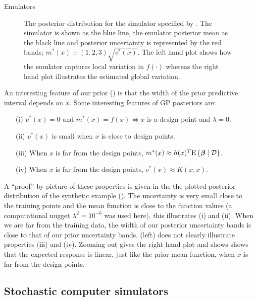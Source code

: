 \begin{chapter}{Emulators \label{Ch:Emulators}}
\begin{figure}[h]
  \caption{The posterior distribution for the simulator specified by . The simulator is shown as the blue line, the emulator posterior mean as the black line and posterior uncertainty is represented by the red bands; $m^{*} (x) \pm (1,2,3)\sqrt{ v^{*}(x) } $. The left hand plot shows how the emulator captures local variation in $f(\cdot)$ whereas the right hand plot illustrates the estimated global variation.}
  \label{Fig:posterior}
\end{figure}

An interesting feature of our prior () is that the width of the prior predictive interval depends on $x$. Some interesting features of GP posteriors are:
\begin{itemize}
  \item[(i)] $v^* (x) = 0 \text{ and } m^*(x) = f(x) \iff x$ is a design point and $\lambda = 0$.
  \item[(ii)] $v^* (x)$ is small when $x$ is close to design points.
  \item[(iii)]  When $x$ is far from the design points, $m^*(x) \approx h(x)^T \textrm{E}\, \{ \bm{\beta} \mid \mathcal{D} \} $.
  \item[(iv)] When $x$ is far from the design points, $v^*(x) \approx K(x,x)$.
\end{itemize}
A ``proof'' by picture of these properties is given in the the plotted posterior distribution of the synthetic example (). The uncertainty is very small close to the training points and the mean function is close to the function values (a computational nugget $\lambda^2 = 10^{-6}$ was used here), this illustrates (i) and (ii). When we are far from the training data, the width of our posterior uncertainty bands is close to that of our prior uncertainty bands.  (left) does not clearly illustrate properties (iii) and (iv). Zooming out gives the right hand plot and shows shows that the expected response is linear, just like the prior mean function, when $x$ is far from the design points.

\subsection{Stochastic computer simulators}


\end{chapter}
